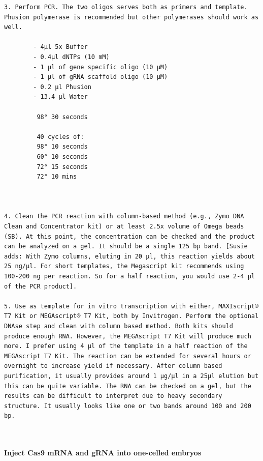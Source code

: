 \documentclass[
  letterpaper,
  DIV=11,
  numbers=noendperiod]{scrreprt}
\begin{document}
\begin{verbatim}
3. Perform PCR. The two oligos serves both as primers and template. Phusion polymerase is recommended but other polymerases should work as well. 

        - 4µl 5x Buffer 
        - 0.4µl dNTPs (10 mM) 
        - 1 µl of gene specific oligo (10 µM) 
        - 1 µl of gRNA scaffold oligo (10 µM) 
        - 0.2 µl Phusion 
        - 13.4 µl Water 
        
         98° 30 seconds 
         
         40 cycles of:  
         98° 10 seconds 
         60° 10 seconds 
         72° 15 seconds 
         72° 10 mins 

 

4. Clean the PCR reaction with column-based method (e.g., Zymo DNA Clean and Concentrator kit) or at least 2.5x volume of Omega beads (SB). At this point, the concentration can be checked and the product can be analyzed on a gel. It should be a single 125 bp band. [Susie adds: With Zymo columns, eluting in 20 µl, this reaction yields about 25 ng/µl. For short templates, the Megascript kit recommends using 100-200 ng per reaction. So for a half reaction, you would use 2-4 µl of the PCR product]. 

5. Use as template for in vitro transcription with either, MAXIscript® T7 Kit or MEGAscript® T7 Kit, both by Invitrogen. Perform the optional DNAse step and clean with column based method. Both kits should produce enough RNA. However, the MEGAscript T7 Kit will produce much more. I prefer using 4 µl of the template in a half reaction of the MEGAscript T7 Kit. The reaction can be extended for several hours or overnight to increase yield if necessary. After column based purification, it usually provides around 1 µg/µl in a 25µl elution but this can be quite variable. The RNA can be checked on a gel, but the results can be difficult to interpret due to heavy secondary structure. It usually looks like one or two bands around 100 and 200 bp. 

 
\end{verbatim}

\textbf{Inject Cas9 mRNA and gRNA into one-celled embryos}
\end{document}
